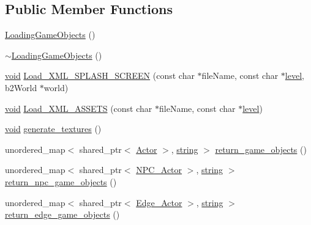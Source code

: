 \subsection*{Public Member Functions}
\begin{DoxyCompactItemize}
\item 
\hyperlink{classLoadingGameObjects_aed114905dd9c0a40377b914a69d5789f}{Loading\+Game\+Objects} ()
\item 
\hyperlink{classLoadingGameObjects_a0c9dbb7f52d5267822cee364ab1bed51}{$\sim$\+Loading\+Game\+Objects} ()
\item 
\hyperlink{imgui__impl__opengl3__loader_8h_ac668e7cffd9e2e9cfee428b9b2f34fa7}{void} \hyperlink{classLoadingGameObjects_ade7e526925ab6d0fbdf29264443aed5a}{Load\+\_\+\+X\+M\+L\+\_\+\+S\+P\+L\+A\+S\+H\+\_\+\+S\+C\+R\+E\+EN} (const char $\ast$file\+Name, const char $\ast$\hyperlink{imgui__impl__opengl3__loader_8h_a2b536fca24f51d6a849aed325793e661}{level}, b2\+World $\ast$world)
\item 
\hyperlink{imgui__impl__opengl3__loader_8h_ac668e7cffd9e2e9cfee428b9b2f34fa7}{void} \hyperlink{classLoadingGameObjects_a35024e1997f012af871381a89ad8d84e}{Load\+\_\+\+X\+M\+L\+\_\+\+A\+S\+S\+E\+TS} (const char $\ast$file\+Name, const char $\ast$\hyperlink{imgui__impl__opengl3__loader_8h_a2b536fca24f51d6a849aed325793e661}{level})
\item 
\hyperlink{imgui__impl__opengl3__loader_8h_ac668e7cffd9e2e9cfee428b9b2f34fa7}{void} \hyperlink{classLoadingGameObjects_a1a82b50cc130b650e77f230d2ea4178b}{generate\+\_\+textures} ()
\item 
unordered\+\_\+map$<$ shared\+\_\+ptr$<$ \hyperlink{classActor}{Actor} $>$, \hyperlink{imgui__impl__opengl3__loader_8h_ac83513893df92266f79a515488701770}{string} $>$ \hyperlink{classLoadingGameObjects_a0674aaeb1df4432423ed598784561d2e}{return\+\_\+game\+\_\+objects} ()
\item 
unordered\+\_\+map$<$ shared\+\_\+ptr$<$ \hyperlink{classNPC__Actor}{N\+P\+C\+\_\+\+Actor} $>$, \hyperlink{imgui__impl__opengl3__loader_8h_ac83513893df92266f79a515488701770}{string} $>$ \hyperlink{classLoadingGameObjects_a867fe8c686aac5eaa7958df8f7b223c8}{return\+\_\+npc\+\_\+game\+\_\+objects} ()
\item 
unordered\+\_\+map$<$ shared\+\_\+ptr$<$ \hyperlink{classEdge__Actor}{Edge\+\_\+\+Actor} $>$, \hyperlink{imgui__impl__opengl3__loader_8h_ac83513893df92266f79a515488701770}{string} $>$ \hyperlink{classLoadingGameObjects_af24882196f85a3a9e2b1b0ab8c12b220}{return\+\_\+edge\+\_\+game\+\_\+objects} ()
\item 

\end{DoxyCompactItemize}
